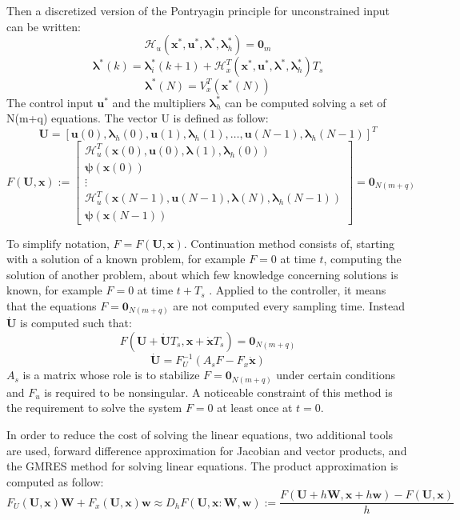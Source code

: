 \documentclass[a4paper, 12pt]{report}
\begin{document}
Then a discretized version of the Pontryagin principle for unconstrained input can be written:
\[ \mathcal{H}_u(\boldsymbol{x}^*, \boldsymbol{u}^*, \boldsymbol{\lambda}^*, \boldsymbol{\lambda}_h^*) = \boldsymbol{0}_m \]
\[ \boldsymbol{\lambda}^*(k)  = \boldsymbol{\lambda}_i^*(k+1) + \mathcal{H}_x^T(\boldsymbol{x}^*, \boldsymbol{u}^*, \boldsymbol{\lambda}^*, \boldsymbol{\lambda}_h^*) T_s\]
\[ \boldsymbol{\lambda}^*(N) = V_x^T(\boldsymbol{x}^*(N)) \]
The control input $\boldsymbol{u}^*$ and the multipliers $\boldsymbol{\lambda}_h^*$ can be computed solving a set of N(m+q) equations. The vector U is defined as follow:
\[\boldsymbol{U} = [\boldsymbol{u}(0), \boldsymbol{\lambda}_h(0), \boldsymbol{u}(1), \boldsymbol{\lambda}_h(1), \ldots, \boldsymbol{u}(N-1), \boldsymbol{\lambda}_h(N-1)]^T \]
\[F(\boldsymbol{U},\boldsymbol{x}) := \begin{bmatrix} \mathcal{H}_u^T(\boldsymbol{x}(0), \boldsymbol{u}(0), \boldsymbol{\lambda}(1), \boldsymbol{\lambda}_h(0)) \\ \boldsymbol{\psi}(\boldsymbol{x}(0)) \\ \vdots \\ \mathcal{H}^T_u (\boldsymbol{x}(N-1), \boldsymbol{u}(N-1), \boldsymbol{\lambda}(N), \boldsymbol{\lambda}_h(N-1)) \\ \boldsymbol{\psi}(\boldsymbol{x}(N-1))\end{bmatrix} = \boldsymbol{0}_{N(m+q)}\]

To simplify notation, $F = F(\boldsymbol{U},\boldsymbol{x})$. Continuation method consists of, starting with a solution of a known problem, for example $F = 0$ at time $t$, computing the solution of another problem, about which few knowledge concerning solutions is known, for example $F = 0$ at time $t + T_s$ \cite{Allgower1987}. Applied to the controller, it means that the equations $F = \boldsymbol{0}_{N(m+q)}$ are not computed every sampling time. Instead $\boldsymbol{\dot U}$ is computed such that:
\[ F(\boldsymbol{U} + \boldsymbol{\dot U}T_s,\boldsymbol{x} + \boldsymbol{\dot x} T_s) = \boldsymbol{0}_{N(m+q)} \]
\[ \boldsymbol{\dot U} = F_U^{-1}(A_s F - F_x \boldsymbol{\dot x}) \]
$A_s$ is a matrix whose role is to stabilize $F = \boldsymbol{0}_{N(m+q)}$ under certain conditions and $F_u$ is required to be nonsingular. A noticeable constraint of this method is the requirement to solve the system $F=0$ at least once at $t=0$.

In order to reduce the cost of solving the linear equations, two additional tools are used, forward difference approximation for Jacobian and vector products, and the GMRES method for solving linear equations.
The product approximation is computed as follow:
\[ F_U(\boldsymbol{U}, \boldsymbol{x}) \boldsymbol{W} + F_x(\boldsymbol{U}, \boldsymbol{x}) \boldsymbol{w} \approx D_h F(\boldsymbol{U}, \boldsymbol{x} : \boldsymbol{W}, \boldsymbol{w}) := \frac{F(\boldsymbol{U} + h\boldsymbol{W}, \boldsymbol{x} + h\boldsymbol{w}) - F(\boldsymbol{U}, \boldsymbol{x})}{h} \]
\end{document}
